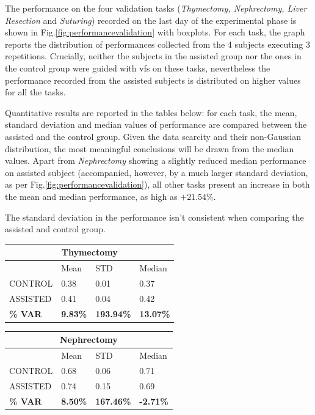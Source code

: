 \documentclass{article}
\begin{document}
\begin{multicols}{2}
The performance on the four validation tasks (\textit{Thymectomy, Nephrectomy, Liver Resection} and \textit{Suturing}) recorded on the last day of the experimental phase is shown in Fig.\ref{fig:performancevalidation} with boxplots. For each task, the graph reports the distribution of performances collected from the 4 subjects executing 3 repetitions. Crucially, neither the subjects in the assisted group nor the ones in the control group were guided with \acp{vf} on these tasks, nevertheless the performance recorded from the assisted subjects is distributed on higher values for all the tasks. 

Quantitative results are reported in the tables below: for each task, the mean, standard deviation and median values of performance are compared between the assisted and the control group. Given the data scarcity and their non-Gaussian distribution, the most meaningful conclusions will be drawn from the median values. Apart from \textit{Nephrectomy} showing a slightly reduced median performance on assisted subject (accompanied, however, by a much larger standard deviation, as per Fig.\ref{fig:performancevalidation}), all other tasks present an increase in both the mean and median performance, as high as $+21.54\%$.

The standard deviation in the performance isn't consistent when comparing the assisted and control group. 
\begin{center}
\begin{tabularx}{\linewidth}{| X | X | X | X |}
\hline
\multicolumn{4}{||c||}{\textbf{Thymectomy}} \\
\hline\hline
 & Mean & STD & Median \\
\hline
CONTROL & 0.38 & 0.01 & 0.37 \\
\hline
ASSISTED & 0.41 & 0.04 & 0.42 \\
\hline
\textbf{\% VAR} & \textbf{9.83\%} & \textbf{193.94\%} & \textbf{13.07\%} \\
\hline
\end{tabularx}
\end{center}

\begin{center}
\begin{tabularx}{\linewidth}{| X | X | X | X |}
\hline
\multicolumn{4}{||c||}{\textbf{Nephrectomy}} \\
\hline\hline
 & Mean & STD & Median \\
\hline
CONTROL & 0.68 & 0.06 & 0.71 \\
\hline
ASSISTED & 0.74 & 0.15 & 0.69 \\
\hline
\textbf{\% VAR} & \textbf{8.50\%} & \textbf{167.46\%} & \textbf{-2.71\%} \\
\hline
\end{tabularx}
\end{center}


\end{multicols}
\end{document}
